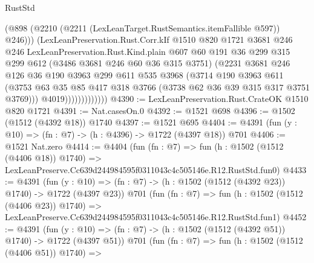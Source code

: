 \begin{lexlean}{RustStd}
\begin{coremodule}
                            (@898
                              (@2210 (@2211 (LexLeanTarget.RustSemantics.itemFallible @597)) @246)))
                          (LexLeanPreservation.Rust.Corr.kIf
                            @1510
                            @820
                            @1721
                            @3681
                            @246
                            @246
                            LexLeanPreservation.Rust.Kind.plain
                            @607
                            @60
                            @191
                            @36
                            @299
                            @315
                            @299
                            @612
                            (@3486 @3681 @246 @60 @36 @315 @3751)
                            (@2231
                              @3681
                              @246
                              @126
                              @36
                              @190
                              @3963
                              @299
                              @611
                              @535
                              @3968
                              (@3714
                                @190
                                @3963
                                @611
                                (@3753
                                  @63
                                  @35
                                  @85
                                  @417
                                  @318
                                  @3766
                                  (@3738 @62 @36 @39 @315 @317 @3751 @3769)))
                              @4019)))))))))))))
@4390 := LexLeanPreservation.Rust.CrateOK @1510 @820 @1721
@4391 := Nat.casesOn.{0}
@4392 := @1521 @698
@4396 := @1502 (@1512 (@4392 @18)) @1740
@4397 := @1521 @695
@4404 := @4391 (fun (y : @10) => (fn : @7) -> (h : @4396) -> @1722 (@4397 @18)) @701
@4406 := @1521 Nat.zero
@4414 := @4404
    (fun (fn : @7) =>
    fun (h : @1502 (@1512 (@4406 @18)) @1740) =>
    LexLeanPreserve.Cc639d244984595f0311043c4c505146e.R12.RustStd.fun0)
@4433 := @4391
    (fun (y : @10) => (fn : @7) -> (h : @1502 (@1512 (@4392 @23)) @1740) -> @1722 (@4397 @23))
    @701
    (fun (fn : @7) =>
    fun (h : @1502 (@1512 (@4406 @23)) @1740) =>
    LexLeanPreserve.Cc639d244984595f0311043c4c505146e.R12.RustStd.fun1)
@4452 := @4391
    (fun (y : @10) => (fn : @7) -> (h : @1502 (@1512 (@4392 @51)) @1740) -> @1722 (@4397 @51))
    @701
    (fun (fn : @7) =>
    fun (h : @1502 (@1512 (@4406 @51)) @1740) =>

\end{coremodule}
\end{lexlean}
